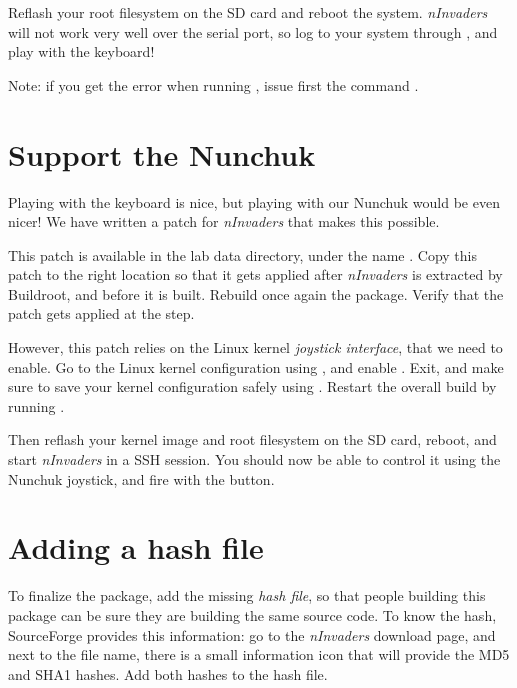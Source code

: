 Reflash your root filesystem on the SD card and reboot the
system. {\em nInvaders} will not work very well over the serial port,
so log to your system through , and play 
with the keyboard!

Note: if you get the error  when running , issue first the
command .

\section{Support the Nunchuk}

Playing with the keyboard is nice, but playing with our Nunchuk would
be even nicer! We have written a patch for {\em nInvaders} that makes
this possible.

This patch is available in the lab data directory, under the name
. Copy this patch to the right
location so that it gets applied after {\em nInvaders} is extracted by
Buildroot, and before it is built. Rebuild once again the
 package. Verify that the patch gets applied at the
 step.

However, this patch relies on the Linux kernel {\em joystick
  interface}, that we need to enable. Go to the Linux kernel
configuration using , and enable
. Exit, and make sure to save your kernel
configuration safely using . Restart
the overall build by running .

Then reflash your kernel image and root filesystem on the SD card,
reboot, and start {\em nInvaders} in a SSH session. You should now be
able to control it using the Nunchuk joystick, and fire with the
 button.

\section{Adding a hash file}

To finalize the package, add the missing {\em hash file}, so that
people building this package can be sure they are building the same
source code. To know the hash, SourceForge provides this information:
go to the {\em nInvaders} download page, and next to the file name,
there is a small information icon that will provide the MD5 and SHA1
hashes. Add both hashes to the hash file.

